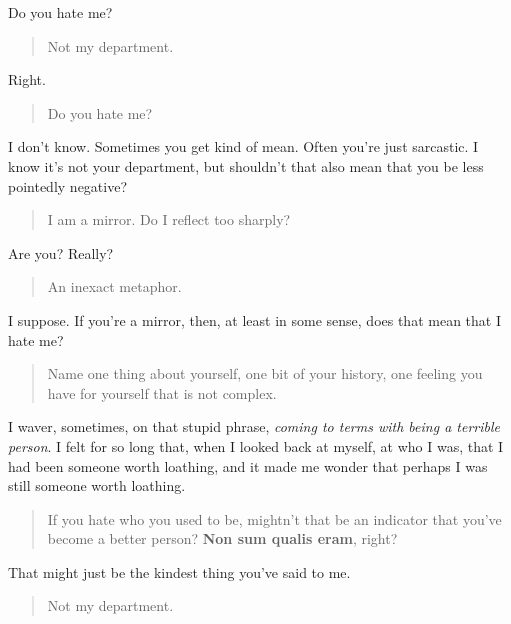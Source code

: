Do you hate me?

\begin{quote}
Not my department.
\end{quote}

Right.

\begin{quote}
Do you hate me?
\end{quote}

I don't know. Sometimes you get kind of mean. Often you're just sarcastic. I know it's not your department, but shouldn't that also mean that you be less pointedly negative?

\begin{quote}
I am a mirror. Do I reflect too sharply?
\end{quote}

Are you? Really?

\begin{quote}
An inexact metaphor.
\end{quote}

I suppose. If you're a mirror, then, at least in some sense, does that mean that I hate me?

\begin{quote}
Name one thing about yourself, one bit of your history, one feeling you have for yourself that is not complex.
\end{quote}

I waver, sometimes, on that stupid phrase, \emph{coming to terms with being a terrible person}. I felt for so long that, when I looked back at myself, at who I was, that I had been someone worth loathing, and it made me wonder that perhaps I was still someone worth loathing.

\begin{quote}
If you hate who you used to be, mightn't that be an indicator that you've become a better person? \textbf{Non sum qualis eram}, right?
\end{quote}

That might just be the kindest thing you've said to me.

\begin{quote}
Not my department.
\end{quote}
